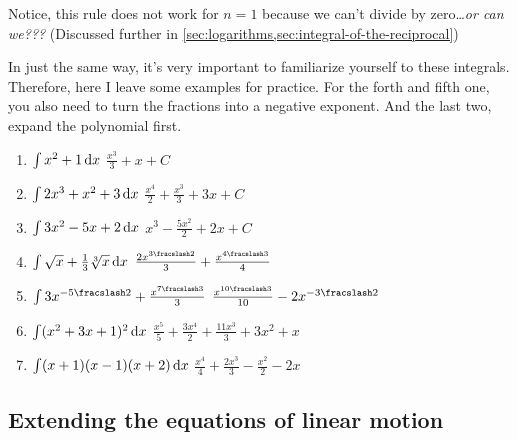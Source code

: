 Notice, this rule does not work for $n = 1$ because we can't divide by zero\dots \emph{or can we???} (Discussed further in \cref{sec:logarithms,sec:integral-of-the-reciprocal})

In just the same way, it's very important to familiarize yourself to these integrals. Therefore, here I leave some examples for practice. For the forth and fifth one, you also need to turn the fractions into a negative exponent. And the last two, expand the polynomial first.
\begin{enumerate}
  \item $\int x^2 + 1\odif{x}$ \hfill $\frac{x^3}{3} + x + C$
  \item $\int 2x^3 + x^2 + 3\odif{x}$ \hfill $\frac{x^4}{2} + \frac{x^3}{3} + 3x + C$
  \item $\int 3x^2 - 5x + 2\odif{x}$ \hfill $x^3 - \frac{5x^2}{2} + 2x + C$
  \item $\int \sqrt{x} + \frac{1}{3}\sqrt[3]{x}\odif{x}$ \hfill $\frac{2x^{\flatfrac{3}{2}}}{3} + \frac{x^{\flatfrac{4}{3}}}{4}$
  \item $\int 3x^{-\flatfrac{5}{2}} + \frac{x^{\flatfrac{7}{3}}}{3}$ \hfill $\frac{x^{\flatfrac{10}{3}}}{10} - 2x^{-\flatfrac{3}{2}}$
  \item $\int (x^2 + 3x + 1)^2 \odif{x}$ \hfill $\frac{x^5}{5} + \frac{3x^4}{2} + \frac{11x^3}{3} + 3x^2 + x$
  \item $\int (x + 1)(x - 1)(x + 2)\odif{x}$ \hfill $\frac{x^4}{4} + \frac{2x^3}{3} - \frac{x^2}{2} - 2x$
\end{enumerate}

\subsection{Extending the equations of linear motion}

